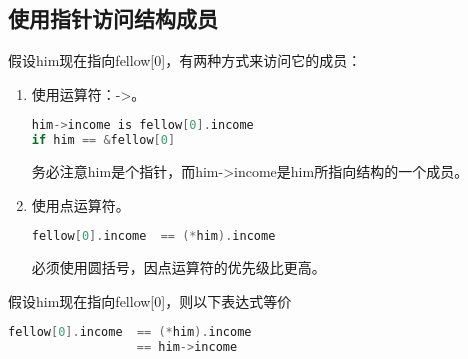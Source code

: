 \subsection{使用指针访问结构成员}
\begin{frame}[fragile]\ft{\subsecname}
假设{\tf him}现在指向{\tf fellow[0]}，有两种方式来访问它的成员：
\begin{enumerate}
\item 使用运算符：{\tf ->}。
    \begin{lstlisting}[language=c,backgroundcolor=\color{red!20}]
him->income is fellow[0].income 
if him == &fellow[0]
    \end{lstlisting}
务必注意{\tf him}是个指针，而{\tf him->income}是{\tf him}所指向结构的一个成员。
\item 使用点运算符。
      \begin{lstlisting}[language=c,backgroundcolor=\color{red!20}]
fellow[0].income  == (*him).income
    \end{lstlisting}
必须使用圆括号，因点运算符的优先级比{\tf *}更高。
\end{enumerate}
\end{frame}

\begin{frame}[fragile]\ft{\subsecname}
假设{\tf him}现在指向{\tf fellow[0]}，则以下表达式等价
\begin{lstlisting}[language=c,backgroundcolor=\color{red!20}]
fellow[0].income  == (*him).income 
                  == him->income
\end{lstlisting}
\end{frame}
